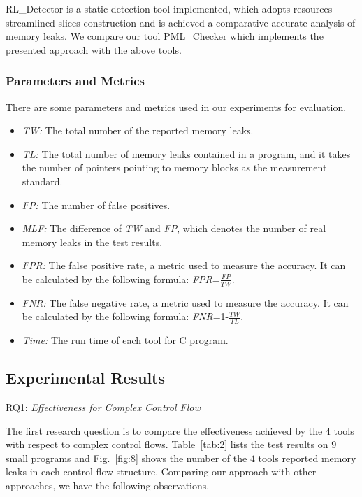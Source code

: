 RL\_Detector is a static detection tool implemented, which adopts resources streamlined slices construction and is achieved a comparative accurate analysis of memory leaks. We compare our tool PML\_Checker which implements the presented approach with the above tools.

\subsubsection{Parameters and Metrics}\label{ssec:pm}
There are some parameters and metrics used in our experiments for evaluation.
\begin{itemize}
\item \textit{TW:} The total number of the reported memory leaks.
\item \textit{TL:} The total number of memory leaks contained in a program, and it takes the number of pointers pointing to memory blocks as the measurement standard.
\item \textit{FP:} The number of false positives.
\item \textit{MLF:} The difference of \textit{TW} and \textit{FP}, which denotes the number of real memory leaks in the test results.
\item \textit{FPR:} The false positive rate, a metric used to measure the accuracy. It can be calculated by the following formula: \textit{FPR}=$\frac{\textit{FP}}{\textit{TW}}$.
\item \textit{FNR:} The false negative rate, a metric used to measure the accuracy. It can be calculated by the following formula: \textit{FNR}=1-$\frac{\textit{TW}}{\textit{TL}}$.
\item \textit{Time:} The run time of each tool for C program.
\end{itemize}

\subsection{Experimental Results}

\noindent RQ1: \textit{Effectiveness for Complex Control Flow}

The first research question is to compare the effectiveness achieved by the $4$ tools with respect to complex control flows. Table~\ref{tab:2} lists the test results on $9$ small programs and Fig.~\ref{fig:8} shows the number of the $4$ tools reported memory leaks in each control flow structure. Comparing our approach with other approaches, we have the following observations.

